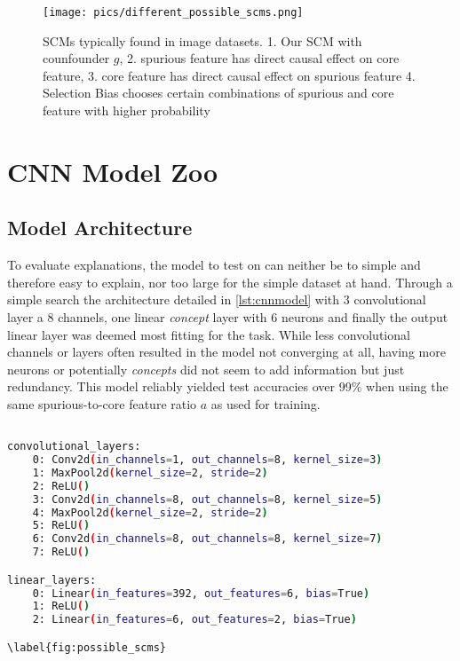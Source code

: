 \begin{figure}[H]
    \centering
    \texttt{[image: pics/different\_possible\_scms.png]}
    \caption{SCMs typically found in image datasets. 
    1. Our SCM with counfounder $g$, 
    2. spurious feature has direct causal effect on core feature, 
    3. core feature has direct causal effect on spurious feature 4. Selection Bias chooses certain combinations of spurious and core feature with higher probability}
    \label{fig:possible_scms}
\end{figure}

\section{CNN Model Zoo}
\subsection{Model Architecture}
To evaluate explanations, the model to test on can neither be to simple and therefore easy to explain, nor too large for the simple dataset at hand. 
Through a simple search the architecture detailed in \autoref{lst:cnnmodel} with 3 convolutional layer a 8 channels, one linear \textit{concept} layer with 6 neurons and finally the output linear layer was deemed most fitting for the task. While less convolutional channels or layers often resulted in the model not converging at all, having more neurons or potentially \textit{concepts} did not seem to add information but just redundancy. 
This model reliably yielded test accuracies over 99\% when using the same spurious-to-core feature ratio $a$ as used for training.

\begin{lstlisting}[language=bash, label=lst:cnnmodel]

convolutional_layers: 
    0: Conv2d(in_channels=1, out_channels=8, kernel_size=3)
    1: MaxPool2d(kernel_size=2, stride=2)
    2: ReLU()
    3: Conv2d(in_channels=8, out_channels=8, kernel_size=5)
    4: MaxPool2d(kernel_size=2, stride=2)
    5: ReLU()
    6: Conv2d(in_channels=8, out_channels=8, kernel_size=7)
    7: ReLU()

linear_layers:
    0: Linear(in_features=392, out_features=6, bias=True)
    1: ReLU()
    2: Linear(in_features=6, out_features=2, bias=True)  

\label{fig:possible_scms}
\end{lstlisting}

